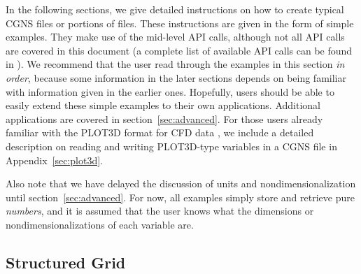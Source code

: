 \documentclass[12pt]{article}
\begin{document}

In the following sections, we give detailed instructions on
how to create typical CGNS files or portions of files.  These 
instructions are
given in the form of simple examples.  They make use of the 
mid-level API calls, although not all API calls are covered in
this document (a complete list of available API calls can be
found in \cite{POIRIER99}).  We recommend that the user
read through the examples in this section {\it in order}, because some
information in the later sections depends on being
familiar with information given in the earlier ones.  Hopefully, 
users should be able to easily
extend these simple examples to their own applications.
Additional applications are covered in 
section~\ref{sec:advanced}.  For those users already familiar with
the PLOT3D format for CFD data \cite{WALATKA}, we include a detailed description
on reading and writing PLOT3D-type variables in a CGNS file in
Appendix~\ref{sec:plot3d}.

Also note that we have delayed the discussion
of units and nondimensionalization until section~\ref{sec:advanced}.
For now, all examples simply store and retrieve pure {\it numbers},
and it is assumed that the user knows what the dimensions or
nondimensionalizations of each variable are.

\newpage
\subsection{Structured Grid} \label{sec:str}
\end{document}
